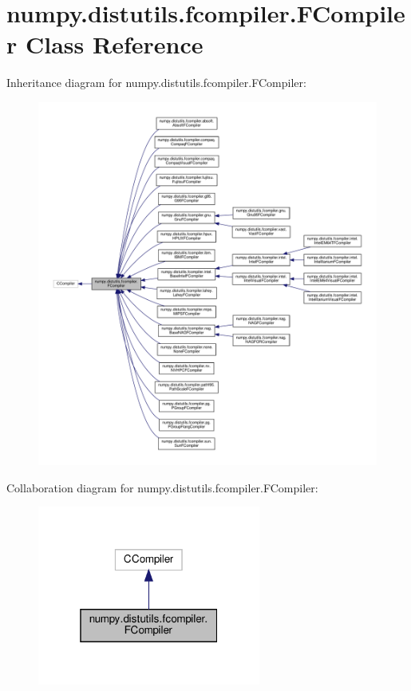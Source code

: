 \hypertarget{classnumpy_1_1distutils_1_1fcompiler_1_1FCompiler}{}\section{numpy.\+distutils.\+fcompiler.\+F\+Compiler Class Reference}
\label{classnumpy_1_1distutils_1_1fcompiler_1_1FCompiler}


Inheritance diagram for numpy.\+distutils.\+fcompiler.\+F\+Compiler\+:
\nopagebreak
\begin{figure}[H]
\begin{center}
\leavevmode
\includegraphics[width=350pt]{classnumpy_1_1distutils_1_1fcompiler_1_1FCompiler__inherit__graph}
\end{center}
\end{figure}


Collaboration diagram for numpy.\+distutils.\+fcompiler.\+F\+Compiler\+:
\nopagebreak
\begin{figure}[H]
\begin{center}
\leavevmode
\includegraphics[width=208pt]{classnumpy_1_1distutils_1_1fcompiler_1_1FCompiler__coll__graph}
\end{center}
\end{figure}
